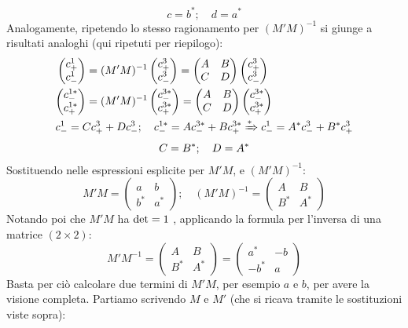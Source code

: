 \documentclass[../../FisicaTeorica.tex]{subfiles}
\begin{document}
\[
c = b^*; \quad d=a^*
\]
Analogamente, ripetendo lo stesso ragionamento per $(M'M)^{-1}$ si giunge a risultati analoghi (qui ripetuti per riepilogo):
\begin{align*}
\begin{pmatrix}
c^1_+\\
c^1_-
\end{pmatrix}
&=(M'M)^{-1} \begin{pmatrix}
c^3_+\\
c^3_-
\end{pmatrix}
= \begin{pmatrix}
A&B\\
C & D
\end{pmatrix}
\begin{pmatrix}
c^3_+\\
c^3_-
\end{pmatrix} \\
\begin{pmatrix}
c^{1*}_-\\
c^{1*}_+
\end{pmatrix}
&=(M'M)^{-1} \begin{pmatrix}
c^{3*}_-\\
c^{3*}_+
\end{pmatrix}
= \begin{pmatrix}
A&B\\
C & D
\end{pmatrix}
\begin{pmatrix}
c^{3*}_-\\
c^{3*}_+
\end{pmatrix}\\
c^1_-=Cc^3_++Dc^3_-; \quad c^{1*}_-= Ac^{3*}_-+Bc^{3*}_+ \xRightarrow[]{*}c^1_-=A^* c^3_-+B^*c^3_+\span\\
C=B^*; \quad D=A^*\span
\end{align*}
Sostituendo nelle espressioni esplicite per $M'M$, e $(M'M)^{-1}$:
\begin{equation}
M'M=\begin{pmatrix}
a&b\\
b^* & a^*
\end{pmatrix}; \quad
(M'M)^{-1}=
\begin{pmatrix}
A & B\\
B^* & A^*
\end{pmatrix}
\label{eqn:matrici_esplicite}
\end{equation}
Notando poi che $M'M$ ha $\operatorname{det}=1$ %
, applicando la formula per l'inversa di una matrice $(2\times 2)$:\[
M'M^{-1} = 
\begin{pmatrix}
A & B\\
B^* & A^*
\end{pmatrix} =
\begin{pmatrix}
a^* & -b\\
-b^* & a
\end{pmatrix}
\]
Basta per ciò calcolare due termini di $M'M$, per esempio $a$ e $b$, per avere la visione completa. Partiamo scrivendo $M$ e $M'$ (che si ricava tramite le sostituzioni viste sopra):
\end{document}
